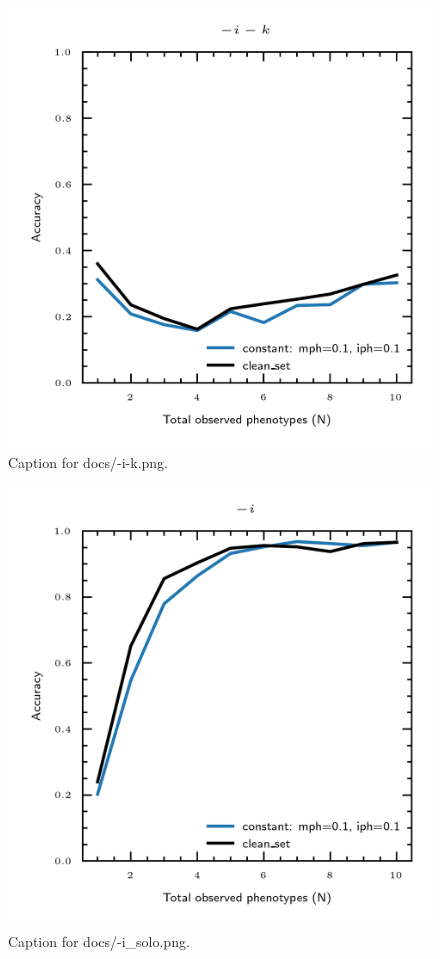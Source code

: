 \documentclass{article}
\begin{document}
\begin{figure}[h] \centering \includegraphics{docs/-i-k.png} \caption{Caption for docs/-i-k.png.} \end{figure}
\begin{figure}[h] \centering \includegraphics{docs/-i_solo.png} \caption{Caption for docs/-i_solo.png.} \end{figure}
\end{document}
